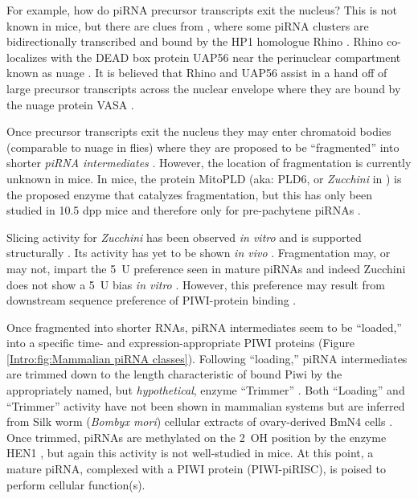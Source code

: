     For example, how do piRNA precursor transcripts exit the nucleus? This is not known in mice, but there are clues from \flies{}, where some piRNA clusters are bidirectionally transcribed and bound by the HP1 homologue Rhino \citep{Klattenhoff2009}. Rhino co-localizes with the DEAD box protein UAP56 near the perinuclear compartment known as nuage \citep{Zhang2012}. It is believed that Rhino and UAP56 assist in a hand off of large precursor transcripts across the nuclear envelope where they are bound by the nuage protein VASA \citep{Zhang2012}.

    Once precursor transcripts exit the nucleus they may enter chromatoid bodies (comparable to nuage in flies) \citep{Lim2007,Meikar2011,Zhang2012,Meikar2014} where they are proposed to be ``fragmented'' into shorter \textit{piRNA intermediates} \citep{Saito2010,Li2013}. However, the location of fragmentation is currently unknown in mice. In mice, the protein MitoPLD (aka: PLD6, or \textit{Zucchini} in \flies{}) is the proposed enzyme that catalyzes fragmentation, but this has only been studied in 10.5 dpp mice and therefore only for pre-pachytene piRNAs \citep{Watanabe2011a}.

    Slicing activity for \textit{Zucchini} has been observed \textit{in vitro} and is supported structurally \citep{Nishimasu2012,Ipsaro2012}. Its activity has yet to be shown \textit{in vivo} \citep{Luteijn2013}. Fragmentation may, or may not, impart the 5\textprime~U preference seen in mature piRNAs \citep{Gunawardane2007,Brennecke2007} and indeed Zucchini does not show a 5\textprime~U bias \textit{in vitro} \citep{Nishimasu2012,Ipsaro2012}. However, this preference may result from downstream sequence preference of PIWI-protein binding \citep{Cora2014}.

    Once fragmented into shorter RNAs, piRNA intermediates seem to be ``loaded,'' into a specific time- and expression-appropriate PIWI proteins (Figure \ref{Intro:fig:Mammalian piRNA classes}). Following ``loading,'' piRNA intermediates are trimmed down to the length characteristic of bound Piwi by the appropriately named, but \textit{hypothetical}, enzyme ``Trimmer'' \citep{Li2013}. Both ``Loading'' and ``Trimmer'' activity have not been shown in mammalian systems but are inferred from Silk worm (\textit{Bombyx mori}) cellular extracts of ovary-derived BmN4 cells \citep{Kawaoka2009}. Once trimmed, piRNAs are methylated on the 2\textprime~OH position by the enzyme HEN1 \citep{Horwich2007,Kirino2007,Ohara2007,Kawaoka2011}, but again this activity is not well-studied in mice. At this point, a mature piRNA, complexed with a PIWI protein (PIWI-piRISC), is poised to perform cellular function(s).

